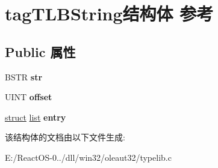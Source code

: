 \hypertarget{structtag_t_l_b_string}{}\section{tag\+T\+L\+B\+String结构体 参考}
\label{structtag_t_l_b_string}
\subsection*{Public 属性}
\begin{DoxyCompactItemize}
\item 
\mbox{\label{structtag_t_l_b_string_abd66fac765f15d88cd54a80c9d39319b}} 
B\+S\+TR {\bfseries str}
\item 
\mbox{\label{structtag_t_l_b_string_ab0e7200046e22efb75e67d65b17de02d}} 
U\+I\+NT {\bfseries offset}
\item 
\mbox{\label{structtag_t_l_b_string_a9525699351cf7857d5c0299ebb9cf70b}} 
\hyperlink{interfacestruct}{struct} \hyperlink{classlist}{list} {\bfseries entry}
\end{DoxyCompactItemize}


该结构体的文档由以下文件生成\+:\begin{DoxyCompactItemize}
\item 
E\+:/\+React\+O\+S-\/0../dll/win32/oleaut32/typelib.\+c\end{DoxyCompactItemize}
